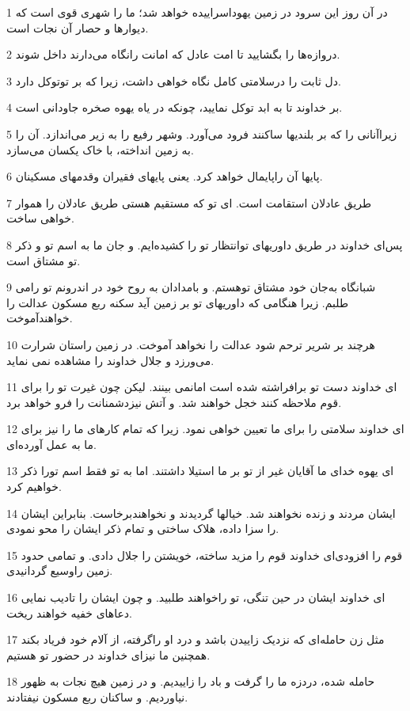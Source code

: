 \par 1 در آن روز این سرود در زمین یهوداسراییده خواهد شد؛ ما را شهری قوی است که دیوارها و حصار آن نجات است. 
\par 2 دروازه‌ها را بگشایید تا امت عادل که امانت رانگاه می‌دارند داخل شوند.
\par 3 دل ثابت را درسلامتی کامل نگاه خواهی داشت، زیرا که بر توتوکل دارد.
\par 4 بر خداوند تا به ابد توکل نمایید، چونکه در یاه یهوه صخره جاودانی است.
\par 5 زیراآنانی را که بر بلندیها ساکنند فرود می‌آورد. وشهر رفیع را به زیر می‌اندازد. آن را به زمین انداخته، با خاک یکسان می‌سازد.
\par 6 پایها آن راپایمال خواهد کرد. یعنی پایهای فقیران وقدمهای مسکینان.
\par 7 طریق عادلان استقامت است. ای تو که مستقیم هستی طریق عادلان را هموار خواهی ساخت.
\par 8 پس‌ای خداوند در طریق داوریهای توانتظار تو را کشیده‌ایم. و جان ما به اسم تو و ذکر تو مشتاق است.
\par 9 شبانگاه به‌جان خود مشتاق توهستم. و بامدادان به روح خود در اندرونم تو رامی طلبم. زیرا هنگامی که داوریهای تو بر زمین آید سکنه ربع مسکون عدالت را خواهندآموخت.
\par 10 هرچند بر شریر ترحم شود عدالت را نخواهد آموخت. در زمین راستان شرارت می‌ورزد و جلال خداوند را مشاهده نمی نماید.
\par 11 ‌ای خداوند دست تو برافراشته شده است امانمی بینند. لیکن چون غیرت تو را برای قوم ملاحظه کنند خجل خواهند شد. و آتش نیزدشمنانت را فرو خواهد برد.
\par 12 ‌ای خداوند سلامتی را برای ما تعیین خواهی نمود. زیرا که تمام کارهای ما را نیز برای ما به عمل آورده‌ای.
\par 13 ‌ای یهوه خدای ما آقایان غیر از تو بر ما استیلا داشتند. اما به تو فقط اسم تورا ذکر خواهیم کرد.
\par 14 ایشان مردند و زنده نخواهند شد. خیالها گردیدند و نخواهندبرخاست. بنابراین ایشان را سزا داده، هلاک ساختی و تمام ذکر ایشان را محو نمودی.
\par 15 قوم را افزودی‌ای خداوند قوم را مزید ساخته، خویشتن را جلال دادی. و تمامی حدود زمین راوسیع گردانیدی.
\par 16 ‌ای خداوند ایشان در حین تنگی، تو راخواهند طلبید. و چون ایشان را تادیب نمایی دعاهای خفیه خواهند ریخت.
\par 17 مثل زن حامله‌ای که نزدیک زاییدن باشد و درد او راگرفته، از آلام خود فریاد بکند همچنین ما نیز‌ای خداوند در حضور تو هستیم.
\par 18 حامله شده، دردزه ما را گرفت و باد را زاییدیم. و در زمین هیچ نجات به ظهور نیاوردیم. و ساکنان ربع مسکون نیفتادند.
